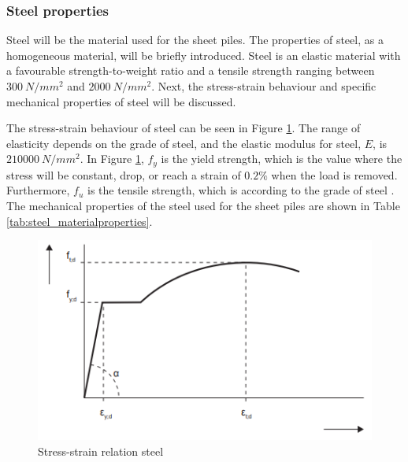 \subsubsection{Steel properties}

Steel will be the material used for the sheet piles. The properties of steel, as a homogeneous material, will be briefly introduced. Steel is an elastic material with a favourable strength-to-weight ratio and a tensile strength ranging between $300 \ N/mm^{2}$ and $2000 \ N/mm^{2}$. Next, the stress-strain behaviour and specific mechanical properties of steel will be discussed.  

The stress-strain behaviour of steel can be seen in Figure \ref{fig:stress_strain_steel}. The range of elasticity depends on the grade of steel, and the elastic modulus for steel, $E$, is  $ 210000 \ N/mm^{2}$. In Figure \ref{fig:stress_strain_steel}, $f_{y}$ is the yield strength, which is the value where the stress will be constant, drop, or reach a strain of $0.2\%$ when the load is removed. Furthermore, $f_{u}$ is the tensile strength, which is according to the grade of steel \autocite{grabeSheetPilingHandbook2008}. The mechanical properties of the steel used for the sheet piles are shown in Table \ref{tab:steel_materialproperties}.


\begin{figure}[H]
    \centering
    \includegraphics[width=0.50\linewidth]{figures/ch8/stress_strain_steel.png}
    \caption{Stress-strain relation steel}
    \label{fig:stress_strain_steel}
\end{figure}

